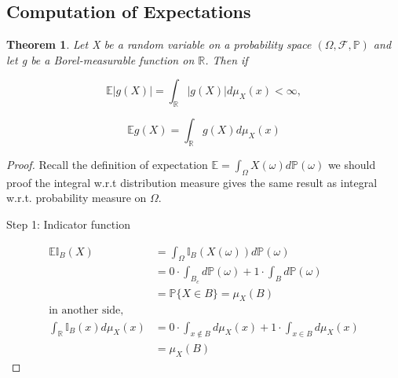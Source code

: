 \documentclass[a4]{article}
\newtheorem{theorem}{Theorem}
\begin{document}
\subsection{Computation of Expectations}
\begin{theorem}\quad \par 
	Let X be a random variable on a probability space $(\Omega, \mathcal{F}, \mathbb{P})$ and let g be a Borel-measurable function on $\mathbb{R}$. Then if\par 
	$$
	\mathbb{E}|g(X)| = \int_{\mathbb{R}}|g(X)| d\mu_{X}(x)<\infty,
	$$

	$$
	\mathbb{E}g(X) = \int_{\mathbb{R}}g(X)d\mu_{X}(x)
	$$
\end{theorem}
\begin{proof}
\noindent Recall the definition of expectation $\mathbb{E} = \int_{\Omega}X(\omega)d\mathbb{P}(\omega)$ we should proof the integral w.r.t distribution measure gives the same result as integral w.r.t. probability measure on $\Omega$.\par 
\bigbreak 
\noindent Step 1: Indicator function\par
$$
\begin{aligned}
\mathbb{E}\mathbb{I}_{B}(X) &= \int_{\Omega}\mathbb{I}_{B}(X(\omega))d\mathbb{P}(\omega)\\
 &= 0\cdot\int_{B_{c}}d\mathbb{P}(\omega) + 1\cdot\int_{B}d\mathbb{P}(\omega) \\
  &= \mathbb{P}\{X\in B\} = \mu_{X}(B)\\
 \text{in another side,} \\
\int_{\mathbb{R}}\mathbb{I}_{B}(x)d\mu_{X}(x) &= 0\cdot \int_{x\notin B}d\mu_{X}(x) + 1\cdot \int_{x\in B}d\mu_{X}(x)\\
& = \mu_{X}(B)
\end{aligned}
$$
\bigbreak 


\end{proof}
\end{document}
